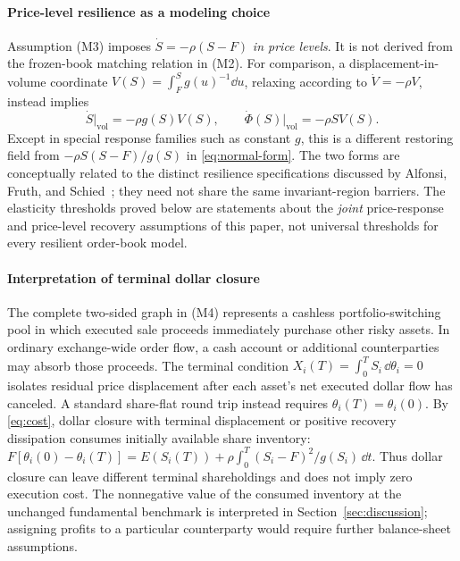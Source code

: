 \documentclass[review,hidelinks,onefignum,onetabnum]{siamonline250211}
\begin{document}
\paragraph{Price-level resilience as a modeling choice}
Assumption (M3) imposes $\dot S=-\rho(S-F)$ \emph{in price levels}. It is not derived from the frozen-book matching relation in (M2). For comparison, a displacement-in-volume coordinate $V(S)=\int_F^S g(u)^{-1}\dd u$, relaxing according to $\dot V=-\rho V$, instead implies
\[
\dot S\big|_{\mathrm{vol}}=-\rho g(S)V(S),\qquad
\dot\Phi(S)\big|_{\mathrm{vol}}=-\rho S V(S).
\]
Except in special response families such as constant $g$, this is a different restoring field from $-\rho S(S-F)/g(S)$ in \eqref{eq:normal-form}. The two forms are conceptually related to the distinct resilience specifications discussed by Alfonsi, Fruth, and Schied~\citep{AlfonsiFruthSchied2010}; they need not share the same invariant-region barriers. The elasticity thresholds proved below are statements about the \emph{joint} price-response and price-level recovery assumptions of this paper, not universal thresholds for every resilient order-book model.

\paragraph{Interpretation of terminal dollar closure}
The complete two-sided graph in (M4) represents a cashless portfolio-switching pool in which executed sale proceeds immediately purchase other risky assets. In ordinary exchange-wide order flow, a cash account or additional counterparties may absorb those proceeds. The terminal condition $X_i(T)=\int_0^T S_i\,\dd\theta_i=0$ isolates residual price displacement after each asset's net executed dollar flow has canceled. A standard share-flat round trip instead requires $\theta_i(T)=\theta_i(0)$. By \eqref{eq:cost}, dollar closure with terminal displacement or positive recovery dissipation consumes initially available share inventory: $F[\theta_i(0)-\theta_i(T)]=E(S_i(T))+\rho\int_0^T(S_i-F)^2/g(S_i)\,\dd t$. Thus dollar closure can leave different terminal shareholdings and does not imply zero execution cost. The nonnegative value of the consumed inventory at the unchanged fundamental benchmark is interpreted in Section~\ref{sec:discussion}; assigning profits to a particular counterparty would require further balance-sheet assumptions.
\end{document}
